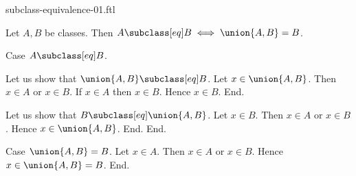 \documentclass{article}
\begin{document}
\begin{smodule}[creators={Marcel Schütz}]{subclass-equivalence-01.ftl}

  \begin{fproposition*}[label=1190630472548352]
    Let $A, B$ be classes.
    Then $A \subclass[eq] B \iff \union{A,B} = B$.
  \end{fproposition*}
  \begin{fproof}
    Case $A \subclass[eq] B$.

      Let us show that $\union{A,B} \subclass[eq] B$.
        Let $x \in \union{A,B}$.
        Then $x \in A$ or $x \in B$.
        If $x \in A$ then $x \in B$.
        Hence $x \in B$.
      End.

      Let us show that $B \subclass[eq] \union{A,B}$.
        Let $x \in B$.
        Then $x \in A$ or $x \in B$.
        Hence $x \in \union{A,B}$.
      End.
    End.

    Case $\union{A,B} = B$.
      Let $x \in A$.
      Then $x \in A$ or $x \in B$.
      Hence $x \in \union{A,B} = B$.
    End.
  \end{fproof}
\end{smodule}
\end{document}

